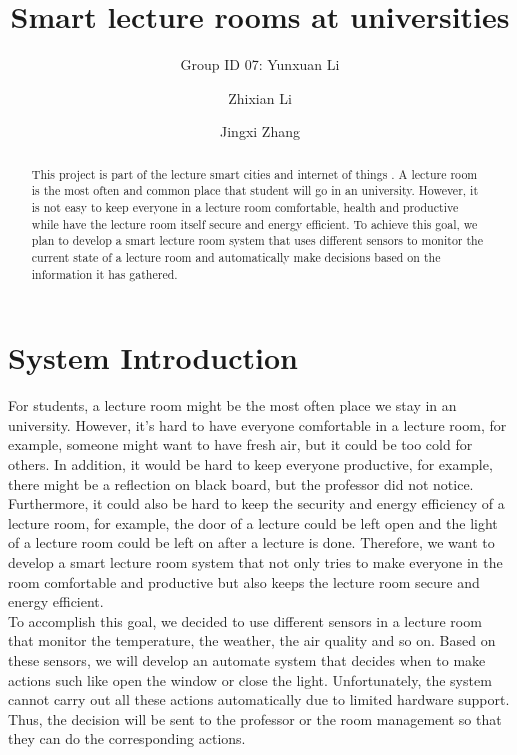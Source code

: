 \documentclass[runningheads]{llncs}
\begin{document}
%
\title{Smart lecture rooms at universities}

\author{Group ID 07: Yunxuan Li \and
Zhixian Li \and
Jingxi Zhang}

%
\maketitle              %
%
\begin{abstract}
This project is part of the lecture smart cities and internet of things \cite{ref_url1}. A lecture room is the most often and common place that student will go in an university. However, it is not easy to keep everyone in a lecture room comfortable, health and productive while have the lecture room itself secure and energy efficient. To achieve this goal, we plan to develop a smart lecture room system that uses different sensors to monitor the current state of a lecture room and automatically make decisions based on the information it has gathered.

\end{abstract}
%
%
%
\section{System Introduction}
For students, a lecture room might be the most often place we stay in an university. However, it’s hard to have everyone comfortable in a lecture room, for example, someone might want to have fresh air, but it could be too cold for others. In addition, it would be hard to keep everyone productive, for example, there might be a reflection on black board, but the professor did not notice.  Furthermore, it could also be hard to keep the security and energy efficiency of a lecture room, for example, the door of a lecture could be left open and the light of a lecture room could be left on after a lecture is done. Therefore, we want to develop a smart lecture room system that not only tries to make everyone in the room comfortable and productive but also keeps the lecture room secure and energy efficient. \\
To accomplish this goal, we decided to use different sensors in a lecture room that monitor the temperature, the weather, the air quality and so on. Based on these sensors, we will develop an automate system that decides when to make actions such like open the window or close the light. Unfortunately, the system cannot carry out all these actions automatically due to limited hardware support. Thus, the decision will be sent to the professor or the room management so that they can do the corresponding actions.
\end{document}
